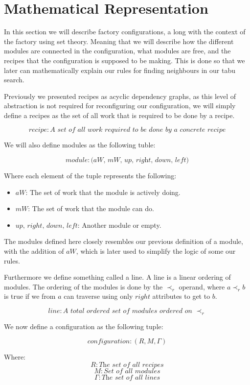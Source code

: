 \section{Mathematical Representation}

In this section we will describe factory configurations, a long with the context of the factory using set theory. Meaning that we will describe how the different modules are connected in the configuration, what modules are free, and the recipes that the configuration is supposed to be making. This is done so that we later can mathematically explain our rules for finding neighbours in our tabu search.

Previously we presented recipes as acyclic dependency graphs, as this level of abstraction is not required for reconfiguring our configuration, we will simply define a recipes as the set of all work that is required to be done by a recipe.

\[recipe: \textit{A set of all work required to be done by a concrete recipe}\]

\noindent We will also define modules as the following tuble:

\[module: \textit{(aW, mW, up, right, down, left)}\]

\noindent Where each element of the tuple represents the following:
\begin{itemize}
\item $aW$: The set of work that the module is actively doing.
\item $mW$: The set of work that the module can do.
\item $up,\, right,\, down,\, left$: Another module or empty.
\end{itemize}

The modules defined here closely resembles our previous definition of a module, with the addition of $aW$, which is later used to simplify the logic of some our rules.

Furthermore we define something called a line. A line is a linear ordering of modules. The ordering of the modules is done by the $\prec_r$ operand, where $a \prec_r b$ is true if we from $a$ can traverse using only $right$ attributes to get to $b$.

\[line: \textit{A total ordered set of modules ordered on } \prec_r\]

We now define a configuration as the following tuple:

\[configuration: (R, M, \Gamma)\]

Where:
\[R: \textit{The set of all recipes}\]
\[M: \textit{Set of all modules}\]
\[\Gamma: \textit{The set of all lines}\]



